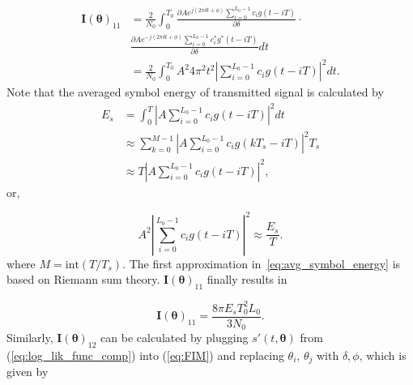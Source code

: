 \begin{appendices}
\begin{equation}
\label{eq:FIM_delta_delta}
\begin{aligned}
\bm{I}(\bm{\theta})_{11}&=\frac{2}{N_{0}}\int_{0}^{T_{0}}\frac{\partial Ae^{j(2\pi\delta t+\phi)}\sum_{i=0}^{L_{0}-1}c_{i}g(t{-}iT)}{\partial \delta} \cdot \\
&\frac{\partial Ae^{-j(2\pi\delta t+\phi)}\sum_{i=0}^{L_{0}-1}c_{i}^{*}g^{*}(t{-}iT)}{\partial \delta}dt \\
&=\frac{2}{N_{0}}\int_{0}^{T_{0}}A^{2}4\pi^{2}t^{2}\left|\sum_{i=0}^{L_{0}-1}c_{i}g(t{-}iT)\right|^{2}dt.
\end{aligned}
\end{equation}
Note that the averaged symbol energy of transmitted signal is calculated by
\begin{equation}
\label{eq:avg_symbol_energy}
\begin{aligned}
E_{s}&=\int_{0}^{T}\left|A\sum_{i=0}^{L_{0}-1}c_{i}g(t{-}iT)\right|^{2}dt \\
&\approx\sum_{k=0}^{M-1}\left|A\sum_{i=0}^{L_{0}-1}c_{i}g(kT_s-iT)\right|^{2}T_{s} \\
&\approx T\left|A\sum_{i=0}^{L_{0}-1}c_{i}g(t-iT)\right|^{2},
\end{aligned}
\end{equation}
or,

\begin{equation}
\label{eq:avg_symbol_energy_deriv}
A^{2}\left|\sum_{i=0}^{L_{0}-1}c_{i}g(t{-}iT)\right|^{2}{\approx}\frac{E_{s}}{T}.
\end{equation}
where $M=\text{int}(T/T_{s})$. The first approximation in~\eqref{eq:avg_symbol_energy} 
is based on Riemann sum theory. $\bm{I}(\bm{\theta})_{11}$ finally results in

\begin{equation}
\label{eq:FIM_delta_delta_result}
\bm{I}(\bm{\theta})_{11}=\frac{8\pi E_{s}T_{0}^2L_{0}}{3N_{0}}.
\end{equation}
Similarly, $\bm{I}(\bm{\theta})_{12}$ can be calculated by plugging $s'(t,\bm{\theta})$ from (\ref{eq:log_lik_func_comp}) into (\ref{eq:FIM}) and replacing $\theta_{i}$, $\theta_{j}$ with $\delta,\phi$, which is given by


\end{appendices}
